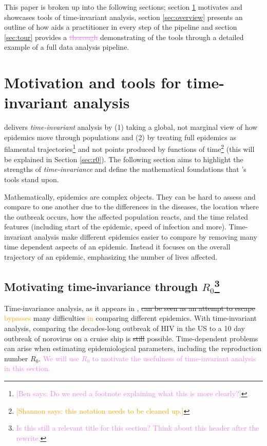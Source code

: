 \documentclass[
  shortnames]{jss}
\begin{document}
This paper is broken up into the following sections; section
\ref{sec:time-invariant} motivates and showcases tools of time-invariant
analysis, section \ref{sec:overview} presents an outline of how
 aids a practitioner in every step of the pipeline and
section \ref{sec:tour} provides a \textcolor{violet}{\sout{thorough}}
demonstrating of the tools through a detailed example of a full data
analysis pipeline.

\section[Time-invariant]{Motivation and tools for time-invariant
analysis}\label{sec:time-invariant}

 delivers \textit{time-invariant} analysis by (1) taking
a global, not marginal view of how epidemics move through populations
and (2) by treating full epidemics as filamental trajectories\footnote{\textcolor{violet}{[Ben says: Do we need a footnote explaining what this is more clearly?]}}
and not points produced by functions of
time\footnote{\textcolor{orange}{[Shannon says: this notation needs to be cleaned up.]}}
(this will be explained in Section \ref{sec:r0}). The following section
aims to highlight the strengths of \textit{time-invariance} and define
the mathematical foundations that 's tools stand upon.

Mathematically, epidemics are complex objects. They can be hard to
assess and compare to one another due to the differences in the
diseases, the location where the outbreak occurs, how the affected
population reacts, and the time related features (including start of the
epidemic, speed of infection and more). Time-invariant analysis make
different epidemics easier to compare by removing many time dependent
aspects of an epidemic. Instead it focuses on the overall trajectory of
an epidemic, emphasizing the number of lives affected.

\subsection[motivating through R0]{Motivating time-invariance through
\(R_0\)\footnote{\textcolor{violet}{Is this still a relevant title for this section? Think about this header after the rewrite.}}}\label{r0}

Time-invariance analysis, as it appears in ,
\sout{can be seen as an attempt to escape} \textcolor{orange}{bypasses}
many difficulties \textcolor{orange}{in} comparing different epidemics.
With time-invariant analysis, comparing the decades-long outbreak of HIV
in the US to a 10 day outbreak of norovirus on a cruise ship is
\sout{still} possible. Time-dependent problems can arise when estimating
epidemiological parameters, including the reproduction number \(R_0\).
\textcolor{violet}{We will use $R_0$ to motivate the usefulness of time-invariant analysis in this section.}
\end{document}
